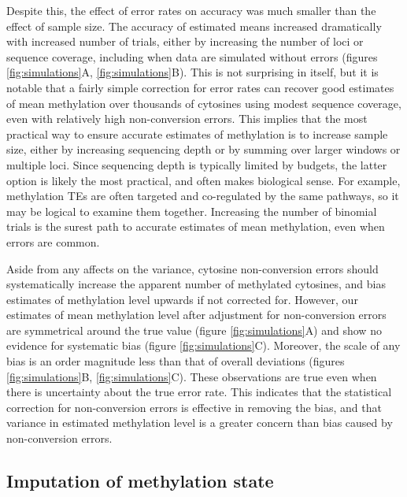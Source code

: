 \documentclass[twocolumn,twoside,lettersize]{article}
\begin{document}
Despite this, the effect of error rates on accuracy was much smaller than the effect of sample size.
The accuracy of estimated means increased dramatically with increased number of trials, either by increasing the number of loci or sequence coverage, including when data are simulated without errors (figures \ref{fig:simulations}A, \ref{fig:simulations}B).
This is not surprising in itself, but it is notable that a fairly simple correction for error rates can recover good estimates of mean methylation over thousands of cytosines using modest sequence coverage, even with relatively high non-conversion errors.
This implies that the most practical way to ensure accurate estimates of methylation is to increase sample size, either by increasing sequencing depth or by summing over larger windows or multiple loci.
Since sequencing depth is typically limited by budgets, the latter option is likely the most practical, and often makes biological sense.
For example, methylation TEs are often targeted and co-regulated by the same pathways, so it may be logical to examine them together.
Increasing the number of binomial trials is the surest path to accurate estimates of mean methylation, even when errors are common.

Aside from any affects on the variance, cytosine non-conversion errors should systematically increase the apparent number of methylated cytosines, and bias estimates of methylation level upwards if not corrected for.
However, our estimates of mean methylation level after adjustment for non-conversion errors are symmetrical around the true value (figure \ref{fig:simulations}A) and show no evidence for systematic bias (figure \ref{fig:simulations}C).
Moreover, the scale of any bias is an order magnitude less than that of overall deviations (figures \ref{fig:simulations}B, \ref{fig:simulations}C).
These observations are true even when there is uncertainty about the true error rate.
This indicates that the statistical correction for non-conversion errors is effective in removing the bias, and that variance in estimated methylation level is a greater concern than bias caused by non-conversion errors.

\subsection{Imputation of methylation state}
\end{document}
